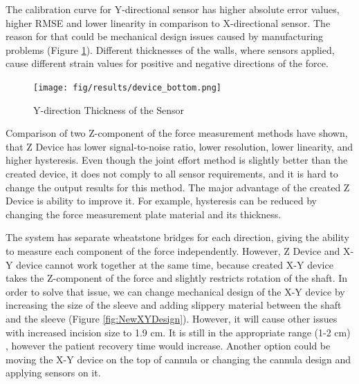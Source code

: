 The calibration curve for Y-directional sensor has higher absolute error values, higher RMSE and lower linearity in comparison to X-directional sensor. The reason for that could be mechanical design issues caused by manufacturing problems (Figure \ref{fig:Syst_err_expl}). Different thicknesses of the walls, where sensors applied, cause different strain values for positive and negative directions of the force.

\begin{figure}[h]
	\begin{center}
	\texttt{[image: fig/results/device\_bottom.png]}
	\end{center}
	\vspace{-4mm}
	\caption[Y-direction Thickness of the Sensor]
	{Y-direction Thickness of the Sensor}
	\label{fig:Syst_err_expl}
	\vspace{-2mm}
\end{figure}

	Comparison of two Z-component of the force measurement methods have shown, that Z Device has lower signal-to-noise ratio, lower resolution, lower linearity, and higher hysteresis. Even though the joint effort method is slightly better than the created device, it does not comply to all sensor requirements, and it is hard to change the output results for this method. The major advantage of the created Z Device is ability to improve it. For example, hysteresis can be reduced by changing the force measurement plate material and its thickness.

The system has separate wheatstone bridges for each direction, giving the ability to measure each component of the force independently. However, Z Device and X-Y device cannot work together at the same time, because created X-Y device takes the Z-component of the force and slightly restricts rotation of the shaft. In order to solve that issue, we can change mechanical design of the X-Y device by increasing the size of the sleeve and adding slippery material between the shaft and the sleeve (Figure \ref{fig:NewXYDesign}). However, it will cause other issues with increased incision size to 1.9 cm. It is still in the appropriate range (1-2 cm) \cite{_laparoscopy}, however the patient recovery time would increase. Another option could be moving the X-Y device on the top of cannula or changing the cannula design and applying sensors on it.

